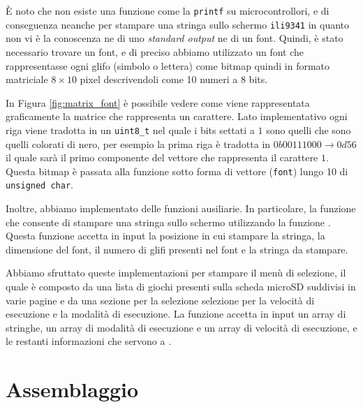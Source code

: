 \documentclass[a4paper]{article}
\begin{document}
È noto che non esiste una funzione come la \texttt{printf} su microcontrollori, e di conseguenza
neanche per stampare una stringa sullo schermo \texttt{ili9341} in quanto non vi è la conoscenza
ne di uno \textit{standard output} ne di un font. Quindi, è stato necessario trovare un font,
e di preciso abbiamo utilizzato un font che rappresentasse ogni glifo (simbolo o lettera) come
bitmap quindi in formato matriciale $8 \times 10$ pixel descrivendoli come 10 numeri a 8 bits.

In Figura \ref{fig:matrix_font} è possibile vedere come viene rappresentata graficamente
la matrice che rappresenta un carattere. Lato implementativo ogni riga viene tradotta in
un \texttt{uint8\_t} nel quale i bits settati a $1$ sono quelli che sono quelli colorati di nero,
per esempio la prima riga è tradotta in $0b00111000 \rightarrow 0d56$ il quale sarà il primo
componente del vettore che rappresenta il carattere $1$. Questa bitmap è passata alla
funzione
{}
sotto forma di vettore (\texttt{font}) lungo 10 di \texttt{unsigned char}.

Inoltre, abbiamo implementato delle funzioni ausiliarie. In particolare, la funzione
{}
che consente di stampare una stringa sullo schermo utilizzando la funzione
{}. Questa funzione accetta in input
la posizione in cui stampare la stringa, la dimensione del font, il numero di glifi presenti
nel font e la stringa da stampare.

Abbiamo sfruttato queste implementazioni per stampare il menù di selezione, il quale
è composto da una lista di giochi presenti sulla scheda microSD suddivisi in varie pagine
e da una sezione per la selezione selezione per la velocità di esecuzione e la modalità
di esecuzione. La funzione accetta in input un array di stringhe, un array di modalità di
esecuzione e un array di velocità di esecuzione, e le restanti informazioni che servono
a {}.

\section{Assemblaggio}
\end{document}
